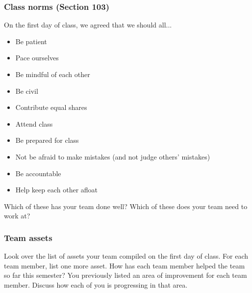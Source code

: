 \documentclass[aspectratio=1610]{beamer}
\begin{document}
\begin{frame}\frametitle{Class norms (Section 103)}
On the first day of class, we agreed that we should all...
\begin{multicols}{2}
\begin{itemize}
\item Be patient
\item Pace ourselves
\item Be mindful of each other
\item Be civil
\item Contribute equal shares
\item Attend class
\item Be prepared for class
\item Not be afraid to make mistakes (and not judge others' mistakes)
\item Be accountable
\item Help keep each other afloat
\end{itemize}
\end{multicols}

\vfill
Which of these has your team done well? Which of these does your team need to work at?
\end{frame}


\begin{frame}\frametitle{Team assets}
Look over the list of assets your team compiled on the first day of class.
\vfill
\pause
For each team member, list one more asset. How has each team member helped the team so far this semester?
\vfill
\pause
You previously listed an area of improvement for each team member. Discuss how each of you is progressing in that area.

\end{frame}
\end{document}
